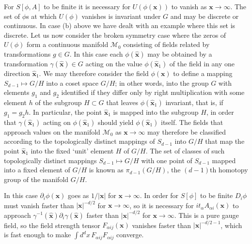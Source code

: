For $S[\phi,A]$ to be finite it is necessary for $U(\phi(\mathbf{x}))$ to
vanish as $\mathbf{x}\to\infty$. The set of $\phi$s at which $U(\phi)$
vanishes is invariant under $G$ and may be discrete or continuous. In case
(b) above we have dealt with an example where this set is discrete. Let us
now consider the broken symmetry case where the zeros of $U(\phi)$ form a
continuous manifold $\mathcal M_0$ consisting of fields related by
transformations $g\in G$. In this case each $\phi(\hat{\mathbf{x}})$ may be
obtained by a transformation $\gamma(\hat{\mathbf{x}})\in G$ acting on the
value $\phi(\hat{\mathbf{x}}_1)$ of the field in any one direction
$\hat{\mathbf{x}}_1$. We may therefore consider the field $\phi(\mathbf{x})$
to define a mapping $S_{d-1}\mapsto G/H$ into a coset space $G/H$; in other
words, into the group $G$ with elements $g_1$ and $g_2$ identified if they
differ only by right multiplication with some element $h$ of the subgroup
$H\subset G$ that leaves $\phi(\hat{\mathbf{x}}_1)$ invariant, that is, if
$g_1=g_2h$. In particular, the point $\hat{\mathbf{x}}_1$ is mapped into
the subgroup $H$, in order that $\gamma(\hat{\mathbf{x}}_1)$ acting on
$\phi(\hat{\mathbf{x}}_1)$ should yield $\phi(\hat{\mathbf{x}}_1)$ itself.
The fields that approach values on the manifold $\mathcal M_0$ as
$\mathbf{x}\to\infty$ may therefore be classified according to the
topologically distinct mappings of $S_{d-1}$ into $G/H$ that map the point
$\hat{\mathbf{x}}_1$ into the fixed `unit' element $H$ of $G/H$. The set of
classes of such topologically distinct mappings $S_{d-1}\mapsto G/H$ with
one point of $S_{d-1}$ mapped into a fixed element of $G/H$ is known as
$\pi_{d-1}(G/H)$, the $(d-1)$th homotopy group of the manifold $G/H$.

In this case $\partial_i\phi(\mathbf{x})$ goes as $1/|\mathbf{x}|$ for
$\mathbf{x}\to\infty$. In order for $S[\phi]$ to be finite $D_i\phi$ must
vanish faster than $|\mathbf{x}|^{-d/2}$ for $\mathbf{x}\to\infty$, so it
is necessary for $it_\alpha A_{\alpha i}(\mathbf{x})$ to approach
$\gamma^{-1}(\hat{\mathbf{x}})\partial_i\gamma(\hat{\mathbf{x}})$ faster
than $|\mathbf{x}|^{-d/2}$ for $\mathbf{x}\to\infty$. This is a pure gauge
field, so the field strength tensor $F_{\alpha ij}(\mathbf{x})$ vanishes
faster than $|\mathbf{x}|^{-d/2-1}$, which is fast enough to make
$\int d^d x\,F_{\alpha ij}F_{\alpha ij}$ converge.

